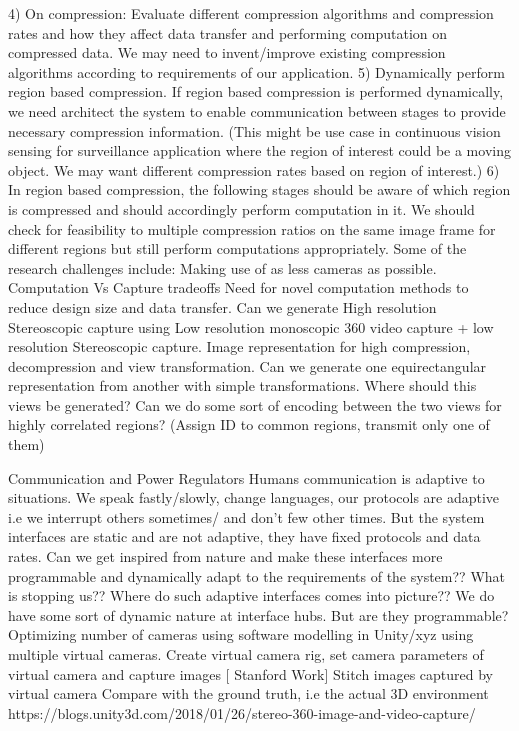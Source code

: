 4)
On compression: 
Evaluate different compression algorithms and compression rates and how they affect data transfer and performing computation on compressed data. We may need to invent/improve existing compression algorithms according to requirements of our application.
5) 
Dynamically perform region based compression. If region based compression is performed dynamically, we need architect the system to enable communication between stages to provide necessary compression information. (This might be use case in continuous vision sensing for surveillance application where the region of interest could be a moving object. We may want different compression rates based on region of interest.) 
6)
In region based compression, the following stages should be aware of which region is compressed and should accordingly​ perform computation in it. We should check for feasibility  to multiple compression ratios on the same image frame for different regions but still perform computations appropriately. 
Some of the research challenges include:
Making use of as less cameras as possible.
Computation Vs Capture tradeoffs
Need for novel computation methods to reduce design size and data transfer.
Can we generate High resolution Stereoscopic capture using Low resolution monoscopic 360 video capture + low resolution Stereoscopic capture.
Image representation for high compression, decompression and view transformation.
Can we generate one equirectangular representation from another with simple transformations. 
Where should this views be generated?
Can we do some sort of encoding between the two views for highly correlated regions? (Assign ID to common regions, transmit only one of them)

Communication and Power Regulators
Humans communication is adaptive to situations. We speak fastly/slowly, change languages, our protocols are adaptive i.e we interrupt others sometimes/ and don't few other times. But the system interfaces are static and are not adaptive, they have fixed protocols and data rates. Can we get inspired from nature and make these interfaces more programmable and dynamically adapt to the requirements of the system?? What is stopping us?? 
Where do such adaptive interfaces comes into picture?? We do have some sort of dynamic nature at interface hubs. But are they programmable?
Optimizing number of cameras using software modelling in Unity/xyz using multiple virtual cameras. 
Create virtual camera rig, set camera parameters of virtual camera and capture images [ Stanford Work]
Stitch images captured by virtual camera 
Compare with the ground truth, i.e the actual 3D environment 
https://blogs.unity3d.com/2018/01/26/stereo-360-image-and-video-capture/


